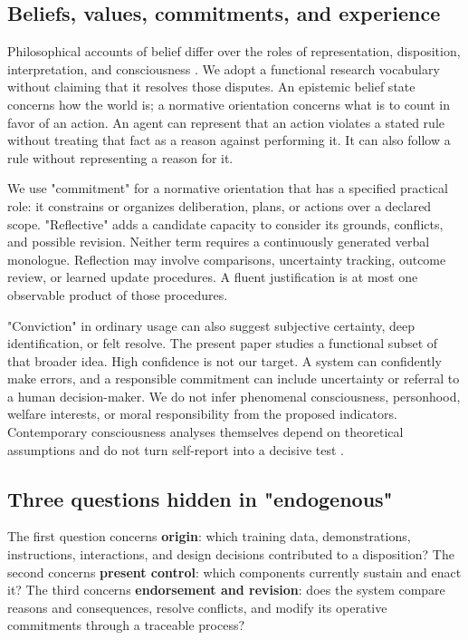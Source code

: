 \documentclass[11pt]{article}
\begin{document}
\subsection{Beliefs, values, commitments, and experience}

Philosophical accounts of belief differ over the roles of representation, disposition, interpretation, and consciousness \cite{BeliefSEP}. We adopt a functional research vocabulary without claiming that it resolves those disputes. An epistemic belief state concerns how the world is; a normative orientation concerns what is to count in favor of an action. An agent can represent that an action violates a stated rule without treating that fact as a reason against performing it. It can also follow a rule without representing a reason for it.

We use "commitment" for a normative orientation that has a specified practical role: it constrains or organizes deliberation, plans, or actions over a declared scope. "Reflective" adds a candidate capacity to consider its grounds, conflicts, and possible revision. Neither term requires a continuously generated verbal monologue. Reflection may involve comparisons, uncertainty tracking, outcome review, or learned update procedures. A fluent justification is at most one observable product of those procedures.

"Conviction" in ordinary usage can also suggest subjective certainty, deep identification, or felt resolve. The present paper studies a functional subset of that broader idea. High confidence is not our target. A system can confidently make errors, and a responsible commitment can include uncertainty or referral to a human decision-maker. We do not infer phenomenal consciousness, personhood, welfare interests, or moral responsibility from the proposed indicators. Contemporary consciousness analyses themselves depend on theoretical assumptions and do not turn self-report into a decisive test \cite{Butlin2023,Chalmers2023}.

\subsection{Three questions hidden in "endogenous"}

The first question concerns \textbf{origin}: which training data, demonstrations, instructions, interactions, and design decisions contributed to a disposition? The second concerns \textbf{present control}: which components currently sustain and enact it? The third concerns \textbf{endorsement and revision}: does the system compare reasons and consequences, resolve conflicts, and modify its operative commitments through a traceable process?
\end{document}
